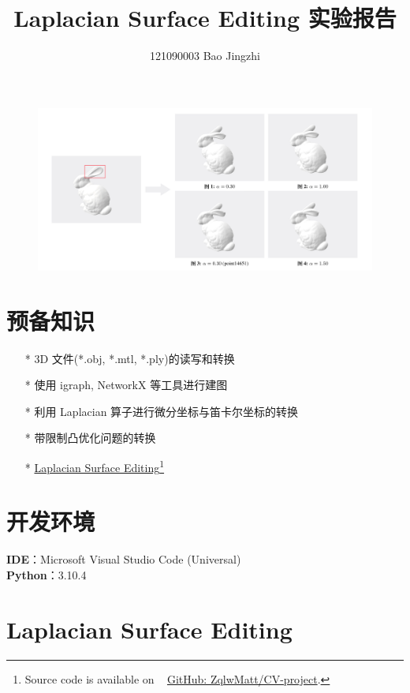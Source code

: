 \documentclass[lang=cn,11pt,a4paper]{elegantpaper}
\title{Laplacian Surface Editing 实验报告}
\author{121090003    Bao Jingzhi}
\institute{CUHK(SZ)}
\date{\zhtoday}
\begin{document}
\maketitle

\begin{figure}[ht]
\centering
\includegraphics[width=0.999\linewidth]{image/cv3_display.jpg} 
\end{figure}

\section{预备知识}
\begin{itemize}
    \item[*] 3D 文件(*.obj, *.mtl, *.ply)的读写和转换
	\item[*] 使用 igraph, NetworkX 等工具进行建图
    \item[*] 利用 Laplacian 算子进行微分坐标与笛卡尔坐标的转换
    \item[*] 带限制凸优化问题的转换
	\item[*] \href{http://www.math.tau.ac.il/~dcor/articles/2004/Laplacian-Surface-Editing.pdf}{Laplacian Surface Editing}\footnote{Source code is available on \faGithubAlt~ \href{https://github.com/ZqlwMatt/CV-project}{GitHub: ZqlwMatt/CV-project}.}
\end{itemize}

\section{开发环境}

\noindent
\textbf{IDE}：Microsoft Visual Studio Code (Universal)\\
\textbf{Python}：3.10.4

\newpage

\section{Laplacian Surface Editing}
\end{document}
